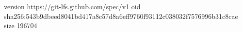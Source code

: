 version https://git-lfs.github.com/spec/v1
oid sha256:543b9dbeed8041bd417a8c57d8a6eff9760f93112c038032f7576996b31c8cae
size 196704
